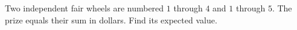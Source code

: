 Two independent fair wheels are numbered $1$ through $4$ and $1$ through $5$. The prize equals their sum in dollars. Find its expected value.
